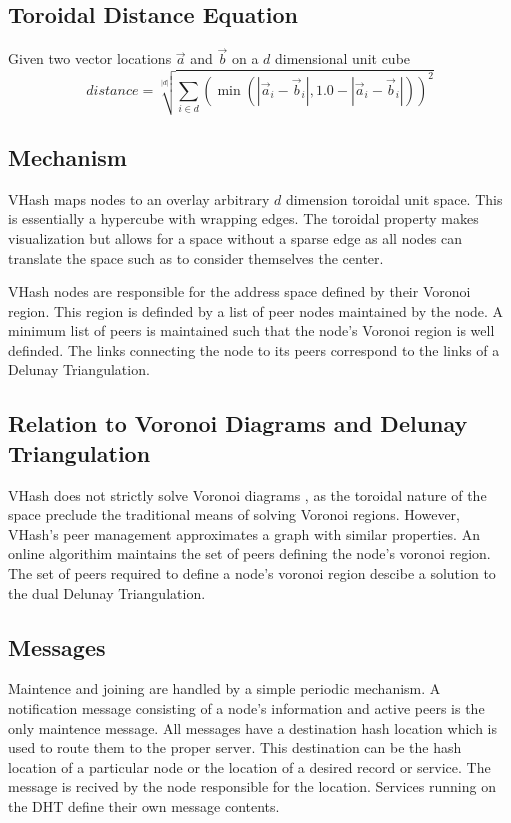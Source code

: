\documentclass[11pt]{IEEEtran} %
\begin{document}
\subsection{Toroidal Distance Equation}

Given two vector locations $\vec{a}$ and $\vec{b}$ on a  $d$ dimensional unit cube
\[ distance = \sqrt[|d|]{\sum\limits_{i\in d} (\min(|\vec{a}_i-\vec{b}_i|,1.0-|\vec{a}_i-\vec{b}_i|))^2}\]

\subsection{Mechanism}
VHash maps nodes to an overlay arbitrary $d$ dimension toroidal unit space. This is essentially a hypercube with wrapping edges. The toroidal property makes visualization but allows for a space without a sparse edge as all nodes can translate the space such as to consider themselves the center.  

VHash nodes are responsible for the address space defined by their Voronoi region. This region is definded by a list of peer nodes maintained by the node. A minimum list of peers is maintained such that the node's Voronoi region is well definded. The links connecting the node to its peers correspond to the links of a Delunay Triangulation. 

\subsection{Relation to Voronoi Diagrams and Delunay Triangulation}

VHash does not strictly solve Voronoi diagrams \cite{voronoi}, as the toroidal nature of the space preclude the traditional means of solving Voronoi regions. However, VHash's peer management approximates a graph with similar properties. 
An online algorithim maintains the set of peers defining the node's voronoi region. The set of peers required to define a node's voronoi region descibe a solution to the dual Delunay Triangulation.

\subsection{Messages}
Maintence and joining are handled by a simple periodic mechanism. A notification message consisting of a node's information and active peers is the only maintence message. All messages have a destination hash location which is used to route them to the proper server. This destination can be the hash location of a particular node or the location of a desired record or service.  The message is recived by the node responsible for the location. Services running on the DHT define their own message contents.
\end{document}
